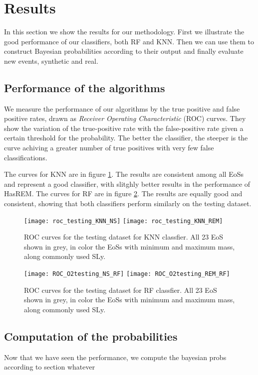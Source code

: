 \section{Results\label{results}}
In this section we show the results for our methodology. First we illustrate the good performance of our classifiers, both \ac{RF} and \ac{KNN}. Then we can use them to construct Bayesian probabilities according to their output and finally evaluate new events, synthetic and real.

\subsection{Performance of the algorithms}
We measure the performance of our algorithms by the true positive and false positive rates, drawn as \textit{Receiver Operating Characteristic} (ROC) curves. They show the variation of the true-positive rate with the false-positive rate given a certain threshold for the probability. The better the classifier, the steeper is the curve achiving a greater number of true positives with very few false classifications.

The curves for \ac{KNN} are in figure \ref{fig:rocO2_KNN}. The results are consistent among all EoSs and represent a good classifier, with slitghly better results in the performance of \ac{HasREM}. The curves for \ac{RF} are in figure \ref{fig:rocO2_RF}. The results are equally good and consistent, showing that both classifiers perform similarly on the testing dataset.


\begin{figure}[h]
\texttt{[image: roc\_testing\_KNN\_NS]}
\texttt{[image: roc\_testing\_KNN\_REM]}
\caption{\label{fig:rocO2_KNN}ROC curves for the testing dataset for \ac{KNN} classfier. All 23 EoS shown in grey, in color the EoSs with minimum and maximum mass, along commonly used SLy.}
\end{figure}

\begin{figure}[h]
\texttt{[image: ROC\_O2testing\_NS\_RF]}
\texttt{[image: ROC\_O2testing\_REM\_RF]}
\caption{\label{fig:rocO2_RF}ROC curves for the testing dataset for \ac{RF} classfier. All 23 EoS shown in grey, in color the EoSs with minimum and maximum mass, along commonly used SLy.}
\end{figure}



\subsection{Computation of the probabilities}
Now that we have seen the performance, we compute the bayesian probs according to section whatever

